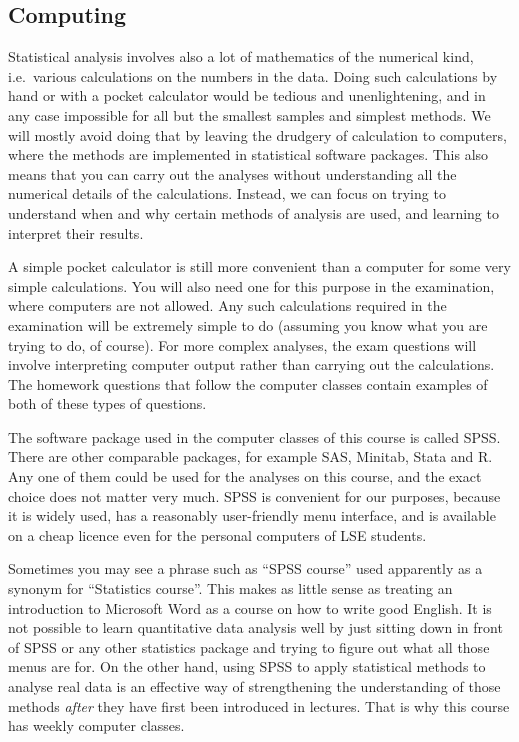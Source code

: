 \documentclass[11pt,a4paper,openany]{book}
\begin{document}
\subsection{Computing}\label{computing-1}

Statistical analysis involves also a lot of mathematics of the numerical
kind, i.e.~various calculations on the numbers in the data. Doing such
calculations by hand or with a pocket calculator would be tedious and
unenlightening, and in any case impossible for all but the smallest
samples and simplest methods. We will mostly avoid doing that by leaving
the drudgery of calculation to computers, where the methods are
implemented in statistical software packages. This also means that you
can carry out the analyses without understanding all the numerical
details of the calculations. Instead, we can focus on trying to
understand when and why certain methods of analysis are used, and
learning to interpret their results.

A simple pocket calculator is still more convenient than a computer for
some very simple calculations. You will also need one for this purpose
in the examination, where computers are not allowed. Any such
calculations required in the examination will be extremely simple to do
(assuming you know what you are trying to do, of course). For more
complex analyses, the exam questions will involve interpreting computer
output rather than carrying out the calculations. The homework questions
that follow the computer classes contain examples of both of these types
of questions.

The software package used in the computer classes of this course is
called SPSS. There are other comparable packages, for example SAS,
Minitab, Stata and R. Any one of them could be used for the analyses on
this course, and the exact choice does not matter very much. SPSS is
convenient for our purposes, because it is widely used, has a reasonably
user-friendly menu interface, and is available on a cheap licence even
for the personal computers of LSE students.

Sometimes you may see a phrase such as ``SPSS course'' used apparently
as a synonym for ``Statistics course''. This makes as little sense as
treating an introduction to Microsoft Word as a course on how to write
good English. It is not possible to learn quantitative data analysis
well by just sitting down in front of SPSS or any other statistics
package and trying to figure out what all those menus are for. On the
other hand, using SPSS to apply statistical methods to analyse real data
is an effective way of strengthening the understanding of those methods
\emph{after} they have first been introduced in lectures. That is why
this course has weekly computer classes.
\end{document}
